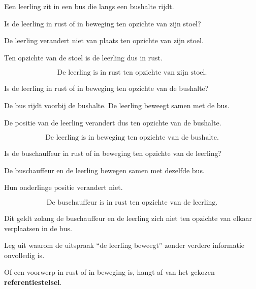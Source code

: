 \documentclass{ximera}
\begin{document}
\begin{oefening}{\oefB\ESS}

Een leerling zit in een bus die langs een bushalte rijdt.

\begin{question}
Is de leerling in rust of in beweging ten opzichte van zijn stoel?

\begin{oplossing}
De leerling verandert niet van plaats ten opzichte van zijn stoel.

Ten opzichte van de stoel is de leerling dus in rust.

\[
\boxed{\text{De leerling is in rust ten opzichte van zijn stoel.}}
\]
\end{oplossing}
\end{question}


\begin{question}
Is de leerling in rust of in beweging ten opzichte van de bushalte?

\begin{oplossing}
De bus rijdt voorbij de bushalte. De leerling beweegt samen met de bus.

De positie van de leerling verandert dus ten opzichte van de bushalte.

\[
\boxed{\text{De leerling is in beweging ten opzichte van de bushalte.}}
\]
\end{oplossing}
\end{question}


\begin{question}
Is de buschauffeur in rust of in beweging ten opzichte van de leerling?

\begin{oplossing}
De buschauffeur en de leerling bewegen samen met dezelfde bus.

Hun onderlinge positie verandert niet.

\[
\boxed{\text{De buschauffeur is in rust ten opzichte van de leerling.}}
\]

Dit geldt zolang de buschauffeur en de leerling zich niet ten opzichte van
elkaar verplaatsen in de bus.
\end{oplossing}
\end{question}


\begin{question}
Leg uit waarom de uitspraak
``de leerling beweegt''
zonder verdere informatie onvolledig is.

\begin{oplossing}
Of een voorwerp in rust of in beweging is, hangt af van het gekozen
\textbf{referentiestelsel}.


\end{oplossing}
\end{question}
\end{oefening}
\end{document}
